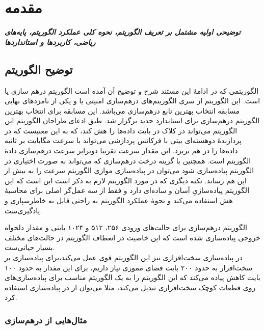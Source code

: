 \chapter{مقدمه}
\noindent
\textbf{
	\textit{
		توضیحی اولیه مشتمل بر تعریف الگوریتم، نحوه کلی عملکرد الگوریتم، پایه‌های ریاضی، کاربردها و استانداردها
	}
}
\pagebreak
\section{توضیح الگوریتم}
\par
الگوریتمی که در ادامهٔ این مستند شرح و توضیح آن آمده است الگوریتم درهم سازی 
یا 
است. این الگوریتم از سری الگوریتم‌های درهم‌سازی امنیتی یا 
و یکی از نامزدهای نهایی مسابقه انتخاب بهترین تابع درهم‌سازی 
می‌باشد. این مسابقه برای انتخاب بهترین الگوریتم در‌هم‌سازی برای استاندارد جدید 
برگزار شد. 
طبق ادعای طراحان الگوریتم این الگوریتم می‌تواند در 
کلاک در بایت داده‌ها را هش کند، که به این معنیست که در پردازندهٔ دوهسته‌ای
بیتی با فرکانس پردازشی
می‌تواند با سرعت 
مگابایت بر ثانیه داده‌ها را در هم بریزد. این مقدار سرعت تقریبا دوبرابر سرعت درهم‌سازی دادهٔ الگوریتم 
است. همچنین با گزینه درخت درهم‌سازی که می‌تواند به صورت اختیاری در الگوریتم پیاده‌سازی شود می‌توان 	در پیاده‌سازی موازی الگوریتم سرعت را به بیش از این هم رساند. نکته دیگری که در مورد الگوریتم 
لازم به ذکر است این است که این الگوریتم پیاده‌سازیِ آسان و ساده‌ای دارد و فقط از سه عمل‌گر اصلی برای محاسبهٔ هش استفاده می‌کند و نحوهٔ عملکرد الگوریتم به راحتی قابل به خاطرسپاری و یادگیری‌ست. 
\par
الگوریتم درهم‌سازی
برای حالت‌های ورودی ۲۵۶، ۵۱۲ و ۱۰۲۴ بایتی و مقدار دلخواه خروجی پیاده‌سازی شده است که این خاصیت در انعطاف الگوریتم در حالت‌های مختلف بسیار حیاتی‌ست. 
\\
در پیاده‌سازی سخت‌افزاری نیز این الگوریتم قوی عمل می‌کند،‌برای پیاده‌سازی 
بر سخت‌افزار به حدود ۲۰۰ بایت فضای مموری نیاز داریم، برای 
این مفدار به حدود ۱۰۰ بایت کاهش پیاده می‌کند که این الگوریتم را به یک الگوریتم مناسب برای پیاده‌سازی‌های روی قطعات کوچک سخت‌افزاری تبدیل می‌کند، مثلا می‌توان از 
در پیاده‌سازی 
استفاده کرد.
\cite{skein}
 
  
\subsection{مثال‌هایی از درهم‌سازی}

